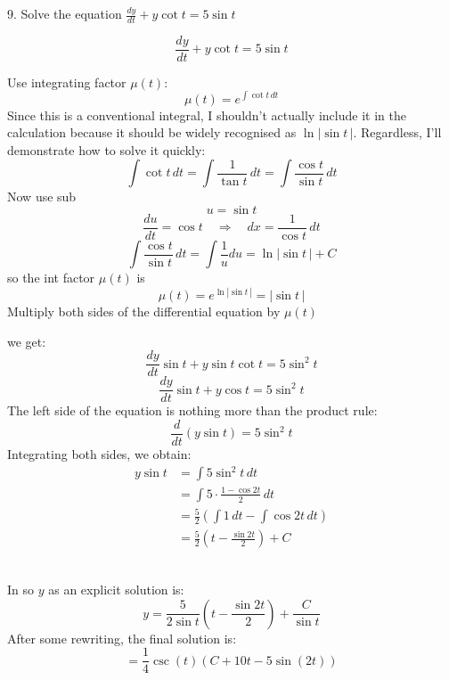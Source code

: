 \documentclass[a4paper, 12pt]{report}
\def\ni{green!60!black!40!white}
\begin{document}
    \begin{tcolorbox}[title={\color{black}\section{Q9}}, colback=white, colframe=\ni, boxrule=1mm, width=1\textwidth]
        9. Solve the equation \( \frac{dy}{dt} + y \cot t = 5 \sin t \)
    \end{tcolorbox}    
    \[\frac{dy}{dt} + y \cot t = 5 \sin t\]
    \begin{minipage}[t]{0.45\textwidth}
        Use integrating factor \( \mu(t) \):
        \[\mu(t) = e^{\int \cot t \, dt}\]
        Since this is a conventional integral, I shouldn't actually include it in the calculation because it should be widely recognised as \(\ln|\sin t \,|\). Regardless, I'll demonstrate how to solve it quickly:        
        \[\int \cot t \, dt = \int \frac{1}{\tan t} \, dt = \int \frac{\cos t}{\sin t} \, dt\]
        Now use sub
        \[u = \sin t\]
        \[\frac{du}{dt} = \cos t \quad \Rightarrow \quad dx = \frac{1}{\cos t} \, dt\]
        \[\int \frac{\cos t}{\sin t} \, dt = \int \frac{1}{u} du = \ln|\sin t\,|+C\]
        so the int factor \(\mu(t)\) is
        \[\mu(t) =e^{\ln |\sin t\,|} = |\sin t\,|\]
        Multiply both sides of the differential equation by \( \mu(t) \)
    \end{minipage}\hfil%
    \begin{minipage}[t]{0.45\textwidth}
    we get:
    \[\frac{dy}{dt}\sin t  + y \sin t \cot t = 5 \sin^2 t\]
    \[\frac{dy}{dt}\sin t  + y\cos t = 5 \sin^2 t\]
    The left side of the equation is nothing more than the product rule:
    \[\frac{d}{dt} (y \sin t) = 5 \sin^2 t\]
    Integrating both sides, we obtain:
    \begin{align*}
        y \sin t &= \int 5 \sin^2 t \, dt\\
        &= \int 5 \cdot \frac{1 - \cos 2t}{2} \, dt\\ 
        &= \frac{5}{2} \left( \int 1 \, dt - \int \cos 2t \, dt \right)\\
        &= \frac{5}{2} \left( t - \frac{\sin 2t}{2} \right) + C
    \end{align*}
    \end{minipage}\\
    In so \(y\) as an explicit solution is:
    \[y = \frac{5}{2 \sin t} \left( t - \frac{\sin 2t}{2} \right) + \frac{C}{\sin t}\]
    After some rewriting, the final solution is:
    \[ \boxed{ = \frac{1}{4} \csc(t) \left( C + 10t - 5 \sin(2t) \right) } \]
    
\end{document}
